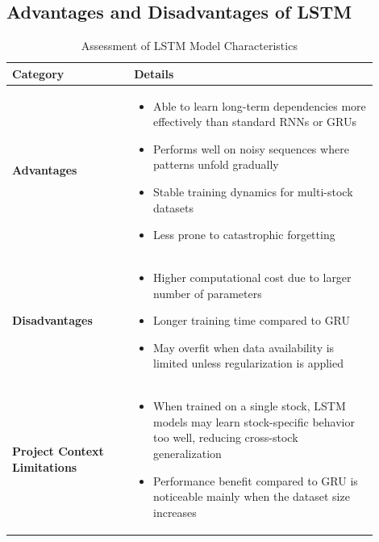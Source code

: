 \FloatBarrier

\subsection{Advantages and Disadvantages of LSTM}

\begin{table}[h]
    \centering
    \begin{tabular}{|p{0.3\linewidth}|p{0.6\linewidth}|}
        \hline
        \textbf{Category} & \textbf{Details} \\
        \hline
        \hline
        \textbf{Advantages} & 
        \begin{itemize}
            \item Able to learn long-term dependencies more effectively than standard RNNs or GRUs
            \item Performs well on noisy sequences where patterns unfold gradually
            \item Stable training dynamics for multi-stock datasets
            \item Less prone to catastrophic forgetting
        \end{itemize} \\
        \hline
        \textbf{Disadvantages} & 
        \begin{itemize}
            \item Higher computational cost due to larger number of parameters
            \item Longer training time compared to GRU
            \item May overfit when data availability is limited unless regularization is applied
        \end{itemize} \\
        \hline
        \textbf{Project Context Limitations} & 
        \begin{itemize}
            \item When trained on a single stock, LSTM models may learn stock-specific behavior too well, reducing cross-stock generalization
            \item Performance benefit compared to GRU is noticeable mainly when the dataset size increases
        \end{itemize} \\
        \hline
    \end{tabular}
    \caption{Assessment of LSTM Model Characteristics}
    \label{tab:lstm_assessment}
\end{table}

